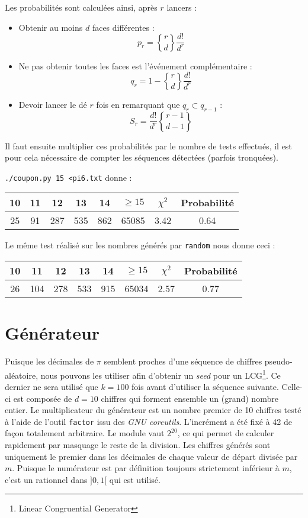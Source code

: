 \documentclass[12pt,a4paper]{article}
\begin{document}
Les probabilités sont calculées ainsi, après $r$ lancers :
\begin{itemize}
	\item Obtenir au moins $d$ faces différentes :
		\[
			p_r = {r \brace d} \frac{d!}{d^r}
		\]
	\item Ne pas obtenir toutes les faces est l'événement complémentaire :
		\[
			q_r = 1 - {r \brace d} \frac{d!}{d^r}
		\]
	\item Devoir lancer le dé $r$ fois
		en remarquant que $q_{r} \subset q_{r-1}$ :
		\[
			S_r = \frac{d!}{d^r} {r-1 \brace d-1}
		\]
\end{itemize}

Il faut ensuite multiplier ces probabilités par
le nombre de tests effectués, il est pour
cela nécessaire de compter les séquences détectées (parfois tronquées).

\texttt{./coupon.py 15 <pi6.txt} donne :
\begin{center}
\begin{tabular}{c|c|c|c|c|c|c|c}
10 & 11 & 12 & 13 & 14 & $\geq 15$ & $\chi^2$ & Probabilité \\ \hline
25 & 91 & 287 & 535 & 862 & 65085 &  3.42 &  0.64
\end{tabular}
\end{center}

Le même test réalisé sur les nombres générés par \texttt{random}
nous donne ceci :
\begin{center}
\begin{tabular}{c|c|c|c|c|c|c|c}
10 & 11 & 12 & 13 & 14 & $\geq 15$ & $\chi^2$ & Probabilité \\ \hline
26 & 104 & 278 & 533 & 915 & 65034 &  2.57 &  0.77
\end{tabular}
\end{center}

\section{Générateur}
Puisque les décimales de $\pi$ semblent proches d'une séquence de chiffres
pseudo-aléatoire, nous pouvons les utiliser afin d'obtenir un \textit{seed}
pour un LCG\footnote{Linear Congruential Generator}. Ce dernier ne sera utilisé
que $k=100$ fois avant d'utiliser la séquence suivante. Celle-ci est composée de
$d=10$ chiffres qui forment ensemble un (grand) nombre entier.
Le multiplicateur du générateur est un nombre premier de 10 chiffres testé
à l'aide de l'outil \texttt{factor} issu des \textit{GNU coreutils}.
L'incrément a été fixé à 42 de façon totalement arbitraire.
Le module vaut $2^{20}$, ce qui permet de calculer rapidement par masquage
le reste de la division.
Les chiffres générés sont uniquement le premier dans les décimales de chaque
valeur de départ divisée par $m$.
Puisque le numérateur est par définition toujours strictement inférieur à $m$,
c'est un rationnel dans $]0,1[$ qui est utilisé.
\end{document}
